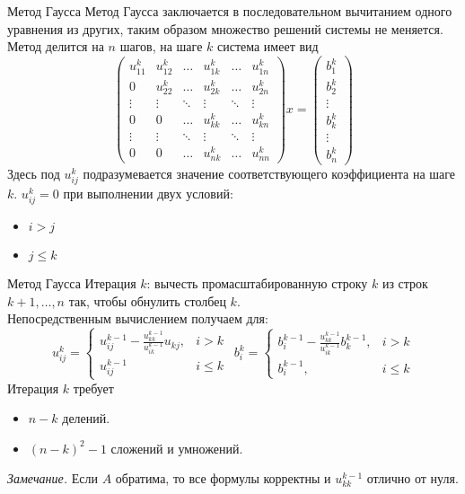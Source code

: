 \documentclass[10pt]{beamer}
\begin{document}
\begin{frame}{Метод Гаусса}
Метод Гаусса заключается в последовательном вычитанием одного уравнения из других, таким образом множество решений системы не меняется. 
\pause
Метод делится на $n$ шагов, на шаге $k$ система имеет вид
$$
\left(
\begin{array}{ccccccc}
u^k_{11} & u^k_{12} & \ldots & u^k_{1k} & \ldots & u^k_{1n} \\
0 & u^k_{22} & \ldots & u^k_{2k} & \ldots & u^k_{2n}\\
\vdots & \vdots &  \ddots & \vdots & \ddots & \vdots \\
0 & 0 & \ldots & u^k_{kk} & \ldots & u^k_{kn} \\
\vdots & \vdots & \ddots & \vdots & \ddots & \vdots \\
0 & 0 & \ldots & u^k_{nk} & \ldots & u^k_{nn}
\end{array}
\right)x
=\left(
\begin{array}{c}
b^k_1\\ b^k_2 \\ \vdots \\ b^k_k \\ \vdots \\ b^k_n
\end{array}
\right)
$$
Здесь под $u^k_{ij}$ подразумевается значение соответствующего коэффициента на шаге $k$. $u^k_{ij}=0$ при выполнении двух условий:
\begin{itemize}
\item $i>j$
\item $j\leq k$
\end{itemize}

\end{frame}

\begin{frame}{Метод Гаусса}
Итерация $k$: вычесть промасштабированную строку $k$ из строк $k+1, \ldots, n$ так, чтобы обнулить столбец $k$.\\
\pause
\vspace{1em}
Непосредственным вычислением получаем для:
$$
u^k_{ij}=\begin{cases}
u^{k-1}_{ij}-\frac{u^{k-1}_{kk}}{u^{k-1}_{ik}}u_{kj}, & i > k\\
u^{k-1}_{ij} & i \leq k
\end{cases}
~~b^k_i = \begin{cases}
b^{k-1}_i-\frac{u^{k-1}_{kk}}{u^{k-1}_{ik}}b^{k-1}_k, & i > k \\
b^{k-1}_i, & i \leq k
\end{cases}
$$
\pause
Итерация $k$ требует
\begin{itemize}[<+->]
\item $n-k$ делений.
\item $(n-k)^2-1$ сложений и умножений.
\end{itemize}
\pause
\textit{Замечание.} Если $A$ обратима, то все формулы корректны и $u^{k-1}_{kk}$ отлично от нуля.
\end{frame}
\end{document}
